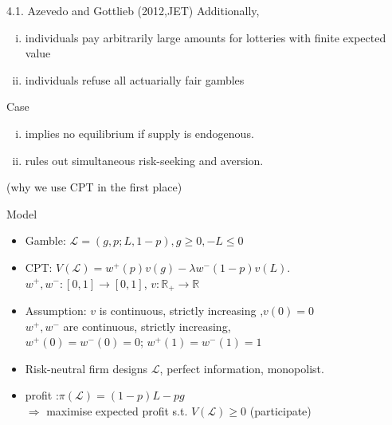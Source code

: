 \documentclass[11pt,aspectratio=169]{beamer}
\begin{document}
\begin{frame}{4.1. Azevedo and Gottlieb (2012,JET)}
 Additionally,
    \begin{enumerate}[i)]
        \item  individuals pay arbitrarily large amounts for lotteries with finite expected value \\
        \item  individuals refuse all actuarially fair gambles\\
    \end{enumerate}
    Case\begin{enumerate}[(i)]
        \item  implies no equilibrium if supply is endogenous. \\
        \item  rules out simultaneous risk-seeking and aversion. \\
    \end{enumerate}
(why we use CPT in the first place)
\end{frame}

\begin{frame}{Model}
    \begin{itemize}
        \item Gamble: $\mathcal{L} =(g,p;L,1-p), g \geq 0, -L\leq 0 $\\
        \item CPT: $V(\mathcal{L} )= w^{+}(p)v(g)-\lambda w^{-}(1-p)v(L).$\\
$w^{+},w^{-}:[0,1] \rightarrow [0,1]$,   \quad $ v:\mathbb{R}_{+} \rightarrow \mathbb{R}$\\
        \item Assumption:
$v$ is continuous, strictly increasing ,$v(0)=0$\\
$w^{+},w^{-}$ are continuous, strictly increasing,\\
\qquad  $w^{+}(0)=w^{-}(0)=0$; $w^{+}(1)=w^{-}(1)=1$\\
        \item Risk-neutral firm designs $\mathcal{L}$, perfect information, monopolist.\\
        \item profit :$\pi(\mathcal{L})=(1-p)L-pg$\\
$\Rightarrow$ maximise expected profit s.t. $V(\mathcal{L})\geq 0$ (participate)\\
    \end{itemize}
\end{frame}
\end{document}
